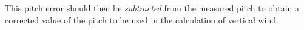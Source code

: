 \documentclass[12pt,twoside,english]{article}\usepackage[]{graphicx}\usepackage[]{color}
\let\OrgIndex\index
\renewcommand*{\index}[1]{\OrgIndex{#1}}
\begin{document}
{{%
% 
% 
% 
% 
This pitch error should then be \emph{subtracted} from the measured pitch to obtain a corrected value of the pitch to be used in the calculation of vertical wind. 


}}
\end{document}
